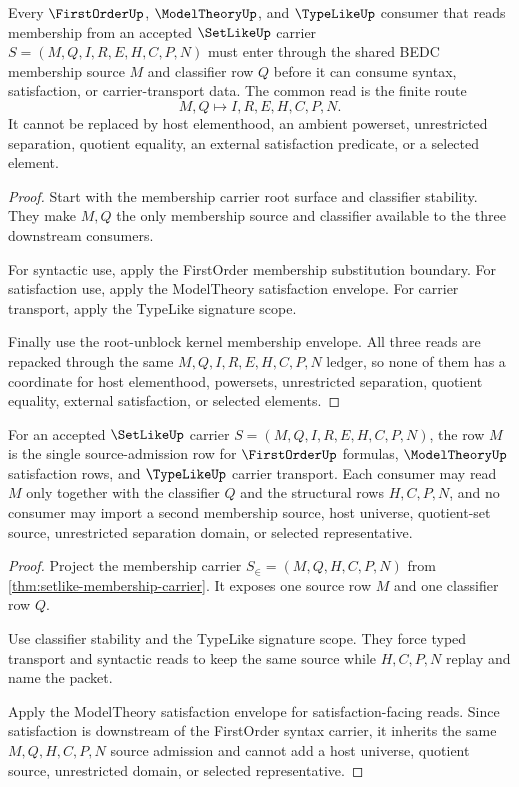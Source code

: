 \begin{theorem}
\label{thm:setlike-root-membership-triple-unblock}
Every $\FirstOrderUp$, $\ModelTheoryUp$, and $\TypeLikeUp$ consumer that reads membership from an accepted $\SetLikeUp$ carrier $S=(M,Q,I,R,E,H,C,P,N)$ must enter through the shared BEDC membership source $M$ and classifier row $Q$ before it can consume syntax, satisfaction, or carrier-transport data. The common read is the finite route
$$
M,Q \longmapsto I,R,E,H,C,P,N .
$$
It cannot be replaced by host elementhood, an ambient powerset, unrestricted separation, quotient equality, an external satisfaction predicate, or a selected element.
\end{theorem}
\begin{proof}
Start with the membership carrier root surface and classifier stability. They make $M,Q$ the only membership source and classifier available to the three downstream consumers.

For syntactic use, apply the FirstOrder membership substitution boundary. For satisfaction use, apply the ModelTheory satisfaction envelope. For carrier transport, apply the TypeLike signature scope.

Finally use the root-unblock kernel membership envelope. All three reads are repacked through the same $M,Q,I,R,E,H,C,P,N$ ledger, so none of them has a coordinate for host elementhood, powersets, unrestricted separation, quotient equality, external satisfaction, or selected elements.
\end{proof}

\begin{theorem}
\label{thm:setlike-root-membership-source-triple}
For an accepted $\SetLikeUp$ carrier $S=(M,Q,I,R,E,H,C,P,N)$, the row $M$ is the single source-admission row for $\FirstOrderUp$ formulas, $\ModelTheoryUp$ satisfaction rows, and $\TypeLikeUp$ carrier transport. Each consumer may read $M$ only together with the classifier $Q$ and the structural rows $H,C,P,N$, and no consumer may import a second membership source, host universe, quotient-set source, unrestricted separation domain, or selected representative.
\end{theorem}
\begin{proof}
Project the membership carrier $S_{\in}=(M,Q,H,C,P,N)$ from \autoref{thm:setlike-membership-carrier}. It exposes one source row $M$ and one classifier row $Q$.

Use classifier stability and the TypeLike signature scope. They force typed transport and syntactic reads to keep the same source while $H,C,P,N$ replay and name the packet.

Apply the ModelTheory satisfaction envelope for satisfaction-facing reads. Since satisfaction is downstream of the FirstOrder syntax carrier, it inherits the same $M,Q,H,C,P,N$ source admission and cannot add a host universe, quotient source, unrestricted domain, or selected representative.
\end{proof}

